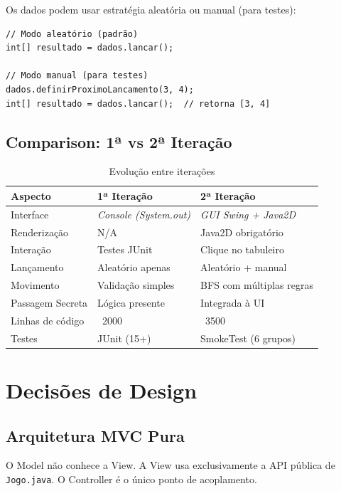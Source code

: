 \documentclass[12pt,a4paper]{report}
\begin{document}
Os dados podem usar estratégia aleatória ou manual (para testes):

\begin{lstlisting}
// Modo aleatório (padrão)
int[] resultado = dados.lancar();

// Modo manual (para testes)
dados.definirProximoLancamento(3, 4);
int[] resultado = dados.lancar();  // retorna [3, 4]
\end{lstlisting}

\section{Comparison: 1ª vs 2ª Iteração}

\begin{table}[H]
\centering
\begin{tabular}{|l|p{3cm}|p{3cm}|}
\hline
\textbf{Aspecto} & \textbf{1ª Iteração} & \textbf{2ª Iteração} \\
\hline
Interface & \textit{Console (System.out)} & \textit{GUI Swing + Java2D} \\
\hline
Renderização & N/A & Java2D obrigatório \\
\hline
Interação & Testes JUnit & Clique no tabuleiro \\
\hline
Lançamento & Aleatório apenas & Aleatório + manual \\
\hline
Movimento & Validação simples & BFS com múltiplas regras \\
\hline
Passagem Secreta & Lógica presente & Integrada à UI \\
\hline
Linhas de código & ~2000 & ~3500 \\
\hline
Testes & JUnit (15+) & SmokeTest (6 grupos) \\
\hline
\end{tabular}
\caption{Evolução entre iterações}
\end{table}

\chapter{Decisões de Design}

\section{Arquitetura MVC Pura}

O Model não conhece a View. A View usa exclusivamente a API pública de \texttt{Jogo.java}. O Controller é o único ponto de acoplamento.
\end{document}
